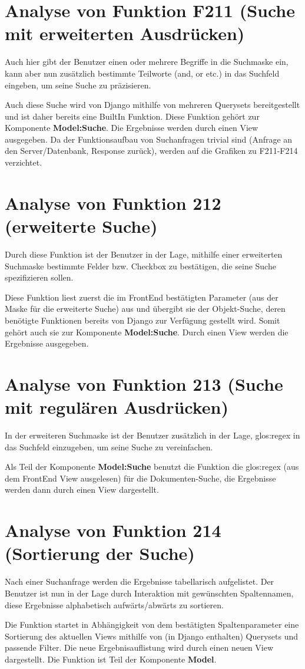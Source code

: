 \section{Analyse von Funktion F211 (Suche mit erweiterten Ausdrücken)}
Auch hier gibt der Benutzer einen oder mehrere Begriffe in die Suchmaske ein, kann aber nun zusätzlich bestimmte Teilworte (and, or etc.) in das Suchfeld eingeben, um seine Suche zu präzisieren.  

Auch diese Suche wird von Django mithilfe von mehreren Querysets bereitgestellt und ist daher bereits eine BuiltIn Funktion. Diese Funktion gehört zur Komponente \textbf{Model:Suche}. Die Ergebnisse werden durch einen View ausgegeben. 
Da der Funktionsaufbau von Suchanfragen trivial sind (Anfrage an den Server/Datenbank, Response zurück), werden auf die Grafiken zu F211-F214 verzichtet.   

\section{Analyse von Funktion 212 (erweiterte Suche)}
Durch diese Funktion ist der Benutzer in der Lage, mithilfe einer erweiterten Suchmaske bestimmte Felder bzw. Checkbox zu bestätigen, die seine Suche spezifizieren sollen.
    
Diese Funktion liest zuerst die im FrontEnd bestätigten Parameter (aus der Maske für die erweiterte Suche) aus und übergibt sie der Objekt-Suche, deren benötigte Funktionen bereits von Django zur Verfügung gestellt wird. Somit gehört auch sie zur Komponente \textbf{Model:Suche}. Durch einen View werden die Ergebnisse ausgegeben. 

\section{Analyse von Funktion 213 (Suche mit regulären Ausdrücken)}
In der erweiteren Suchmaske ist der Benutzer zusätzlich in der Lage, \gls{glos:regex} in das Suchfeld einzugeben, um seine Suche zu vereinfachen. 

Als Teil der Komponente \textbf{Model:Suche} benutzt die Funktion die \gls{glos:regex} (aus dem FrontEnd View ausgelesen) für die Dokumenten-Suche, die Ergebnisse werden dann durch einen View dargestellt.
 
\section{Analyse von Funktion 214 (Sortierung der Suche)}
Nach einer Suchanfrage werden die Ergebnisse tabellarisch aufgelistet. Der Benutzer ist nun in der Lage durch Interaktion mit gewünschten Spaltennamen, diese Ergebnisse alphabetisch aufwärts/abwärts zu sortieren. 

Die Funktion startet in Abhängigkeit von dem bestätigten Spaltenparameter eine Sortierung des aktuellen Views mithilfe von (in Django enthalten) Querysets und passende Filter. Die neue Ergebnisauflistung wird durch einen neuen View dargestellt. Die Funktion ist Teil der Komponente \textbf{Model}. 




 
